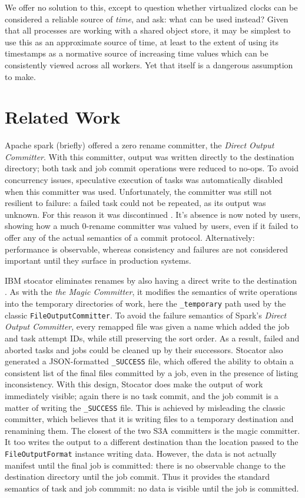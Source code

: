 \documentclass[9pt,technote]{IEEEtran}
\begin{document}
We offer no solution to this, except to question whether virtualized clocks can be considered a reliable source of \emph{time}, and ask: what can be used instead?
Given that all processes are working with a shared object store, it may be simplest to use this as an approximate source of time, at least to the extent of using its timestamps as a normative source of increasing time values which can be consistently viewed across all workers.
Yet that itself is a dangerous assumption to make.


\section{Related Work}

Apache spark (briefly) offered a zero rename committer, the \emph{Direct Output Committer}\cite{JIRA}.
With this committer, output was written directly to the destination directory;
both task and job commit operations were reduced to no-ops.
To avoid concurrency issues, speculative execution of tasks was automatically disabled when this committer was used.
Unfortunately, the committer was still not resilient to failure: a failed task could not be repeated, as its output was unknown.
For this reason it was discontinued \cite{DOC-JIRA}.
It's absence is now noted by users, showing how a much 0-rename committer was valued by users, even if it failed to offer any of the actual semantics of a commit protocol.
Alternatively: performance is observable, whereas consistency and failures are not considered important until they surface in production systems.

IBM stocator eliminates renames by also having a direct write to the destination  \cite{DBLP:journals/corr/abs-1709-01812}.
As with the \emph{the Magic Committer}, it modifies the semantics of write operations into the temporary directories of work, here the \texttt{\_temporary} path used by the classic \texttt{FileOutputCommitter}.
To avoid the failure semantics of Spark's \emph{Direct Output Committer}, every remapped file was given a name which added the job and task attempt IDs, while still preserving the sort order.
As a result, failed and aborted tasks and jobs could be cleaned up by their successors.
Stocator also generated a JSON-formatted \texttt{\_SUCCESS} file, which offered the ability to obtain a consistent list of the final files committed by a job, even in the presence of listing inconsistency.
With this design, Stocator does make the output of work immediately visible;
again there is no task commit, and the job commit is a matter of writing the \texttt{\_SUCCESS} file.
This is achieved by misleading the classic committer, which believes that it is writing files to a temporary destination and renamining them.
The closest of the two S3A committers is the magic committer.
It too writes the output to a different destination than the location passed to the \texttt{FileOutputFormat} instance writing data.
However, the data is not actually manifest until the final job is committed: there is no observable change to the destination directory until the job commit.
Thus it provides the standard semantics of task and job commmit: no data is visible until the job is committed.
\end{document}
